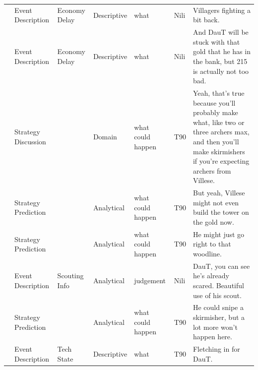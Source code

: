{\begin{longtable}{@{}>{\theAppRow}r|L{2.3cm}L{2.2cm}L{1.4cm}L{2.2cm}L{0.5cm}U{5.6cm}@{}}
    & Event Description     & Economy Delay        & Descriptive   & what              & Nili    & Villagers fighting a bit back.                                                                                                                                                                                           \\
    & Event Description     & Economy Delay        & Descriptive   & what              & Nili    & And DauT will be stuck with that gold that he has in the bank, but 215 is actually not too bad.                                                                                                                          \\
    & Strategy Discussion       &                  & Domain      & what could happen & T90     & Yeah, that's true because you'll probably make what, like two or three archers max, and then you'll make skirmishers if you're expecting archers from Villese.                                                           \\
    & Strategy Prediction   &                      & Analytical  & what could happen & T90     & But yeah, Villese might not even build the tower on the gold now.                                                                                                                                                        \\
    & Strategy Prediction   &                      & Analytical  & what could happen & T90     & He might just go right to that woodline.                                                                                                                                                                                 \\
    & Event Description     & Scouting Info        & Analytical  & judgement         & Nili    & DauT, you can see he's already scared. Beautiful use of his scout.                                                                                                                                                       \\
    & Strategy Prediction   &                      & Analytical  & what could happen & T90     & He could snipe a skirmisher, but a lot more won't happen here.                                                                                                                                                           \\
    & Event Description     & Tech State     & Descriptive   & what              & T90     & Fletching in for DauT.                                                                                                                                                                                                   \\

\end{longtable}}
